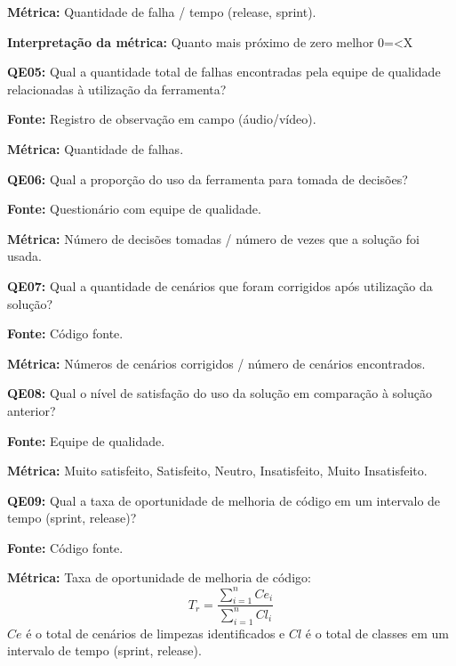 \textbf{Métrica:} Quantidade de falha / tempo (release, sprint).

\textbf{Interpretação da métrica:} Quanto mais próximo de zero melhor 0=<X \newline


\textbf{QE05: } Qual a quantidade total de falhas encontradas pela equipe de qualidade relacionadas à utilização da ferramenta?

\textbf{Fonte:} Registro de observação em campo (áudio/vídeo).

\textbf{Métrica:} Quantidade de falhas. \newline


\textbf{QE06: } Qual a proporção do uso da ferramenta para tomada de decisões?

\textbf{Fonte:} Questionário com equipe de qualidade.

\textbf{Métrica:} Número de decisões tomadas / número de vezes que a solução foi usada. \newline



\textbf{QE07: } Qual a quantidade de cenários que foram corrigidos após utilização da solução?

\textbf{Fonte:} Código fonte.

\textbf{Métrica:} Números de cenários corrigidos / número de cenários encontrados. \newline


\textbf{QE08: } Qual o nível de satisfação do uso da solução em comparação à solução anterior? 

\textbf{Fonte:} Equipe de qualidade.

\textbf{Métrica:} Muito satisfeito, Satisfeito, Neutro, Insatisfeito, Muito Insatisfeito. \newline


\textbf{QE09: } Qual a taxa de oportunidade de melhoria de código em um intervalo de tempo (sprint, release)? 

\textbf{Fonte:} Código fonte.

\textbf{Métrica:} Taxa de oportunidade de melhoria de código: $$ T_r =   \frac{{\sum_{i=1}^{n}{Ce_i}}}{\sum_{i=1}^{n}{Cl_i}} $$ $ Ce $ é o total de cenários de limpezas identificados e $ Cl $  é o total de classes em um intervalo de tempo (sprint, release).

